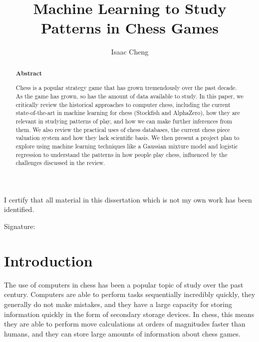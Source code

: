 \documentclass[%
 superscriptaddress,
showpacs,preprintnumbers,
 amsmath,
 amssymb,
 aps,
 pra,
showkeys,
onecolumn,
notitlepage,
11pt,
tightenlines      %
]{revtex4-1}
\begin{document}
\title{\Large Machine Learning to Study Patterns in Chess Games}

\author{Isaac Cheng}

\begin{abstract}
\noindent \textbf{Abstract}

\noindent 
Chess is a popular strategy game that has grown tremendously over the past decade. As the game has grown, so has the amount of data available to study. In this paper, we critically review the historical approaches to computer chess, including the current state-of-the-art in machine learning for chess (Stockfish and AlphaZero), how they are relevant in studying patterns of play, and how we can make further inferences from them. We also review the practical uses of chess databases, the current chess piece valuation system and how they lack scientific basis. We then present a project plan to explore using machine learning techniques like a Gaussian mixture model and logistic regression to understand the patterns in how people play chess, influenced by the challenges discussed in the review.

\end{abstract}

\maketitle

\vspace*{\fill}


\begin{center}
I certify that all material in this dissertation which is not my own work has been identified.
\end{center}
\vspace{1em}

Signature: \hrulefill


\newpage
\section{Introduction}
The use of computers in chess has been a popular topic of study over the past century. Computers are able to perform tasks sequentially incredibly quickly, they generally do not make mistakes, and they have a large capacity for storing information quickly in the form of secondary storage devices. In chess, this means they are able to perform move calculations at orders of magnitudes faster than humans, and they can store large amounts of information about chess games.
\end{document}
